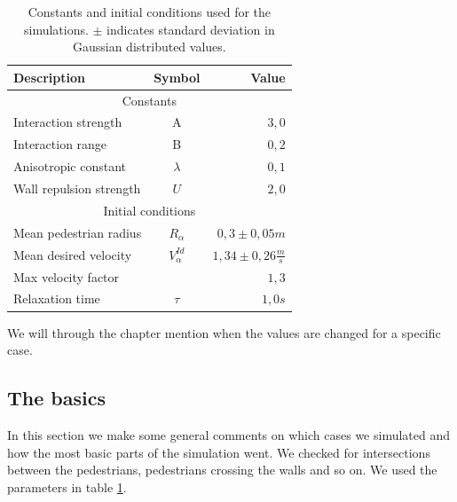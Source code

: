 \begin{table}[ht]
    \begin{center}
        \begin{tabular}{l c r}
            \toprule
            \textbf{Description} & \textbf{Symbol} & \textbf{Value} \\
            \midrule
            \multicolumn{3}{c}{\textsf{Constants}}\\
            Interaction strength & A & $3,0$ \\
            Interaction range & B & $0,2$ \\
            Anisotropic constant & $\lambda$ & $0,1$ \\
            Wall repulsion strength & $U$ &  $2,0$ \\
            \midrule
            \multicolumn{3}{c}{\textsf{Initial conditions}}\\
            Mean pedestrian radius & $R_\alpha$ & $0,3 \pm 0,05 m$\\
            Mean desired velocity &  $V^{Id}_\alpha$ &  $1,34 \pm 0,26 
            \frac{m}{s}$ \\
            Max velocity factor &  &  $1,3$ \\
            Relaxation time & $\tau$ & $1,0 s$\\
            \bottomrule
        \end{tabular}
        \caption[Constants and initial conditions]{Constants and initial 
        conditions used for the simulations. $\pm$ indicates standard 
        deviation in Gaussian distributed values.}
        \label{tbl:parameter-settings}
    \end{center}
\end{table}

We will through the chapter mention when the values are changed for a 
specific case.  

\subsection{The basics}
In this section we make some general comments on which cases we simulated 
and how the most basic parts of the simulation went. We checked for 
intersections between the pedestrians, pedestrians crossing the walls 
and so on. We used the parameters in table \ref{tbl:parameter-settings}. 

